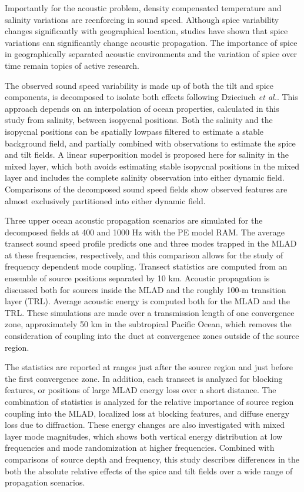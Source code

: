 \documentclass[preprint,NumberedRefs]{JASA}
\begin{document}
Importantly for the acoustic problem, density compensated temperature and salinity variations are reenforcing in sound speed. Although spice variability changes significantly with geographical location, studies have shown that spice variations can significantly change acoustic propagation\citep{colosi12,colosi13,murat2021}. The importance of spice in geographically separated acoustic environments and the variation of spice over time remain topics of active research.

The observed sound speed variability is made up of both the tilt and spice components, is decomposed to isolate both effects following Dzieciuch \emph{et al.}\citep{dzieciuch2004}. This approach depends on an interpolation of ocean properties, calculated in this study from salinity, between isopycnal positions. Both the salinity and the isopycnal positions can be spatially lowpass filtered to estimate a stable background field, and partially combined with observations to estimate the spice and tilt fields. A linear superposition model is proposed here for salinity in the mixed layer, which both avoids estimating stable isopycnal positions in the mixed layer and includes the complete salinity observation into either dynamic field. Comparisons of the decomposed sound speed fields show observed features are almost exclusively partitioned into either dynamic field.

Three upper ocean acoustic propagation scenarios are simulated for the decomposed fields at 400 and 1000 Hz with the PE model RAM\cite{collins93}. The average transect sound speed profile predicts one and three modes trapped in the MLAD at these frequencies, respectively, and this comparison allows for the study of frequency dependent mode coupling. Transect statistics are computed from an ensemble of source positions separated by 10 km. Acoustic propagation is discussed both for sources inside the MLAD and the roughly 100-m transition layer (TRL). Average acoustic energy is computed both for the MLAD and the TRL. These simulations are made over a transmission length of one convergence zone\citep{jensen2011computational}, approximately 50 km in the subtropical Pacific Ocean, which removes the consideration of coupling into the duct at convergence zones outside of the source region\citep{colosi2020observations}.

The statistics are reported at ranges just after the source region and just before the first convergence zone. In addition, each transect is analyzed for blocking features\citep{colosi2020observations}, or positions of large MLAD energy loss over a short distance. The combination of statistics is analyzed for the relative importance of source region coupling into the MLAD, localized loss at blocking features, and diffuse energy loss due to diffraction. These energy changes are also investigated with mixed layer mode magnitudes, which shows both vertical energy distribution at low frequencies and mode randomization at higher frequencies. Combined with comparisons of source depth and frequency, this study describes differences in the both the absolute relative effects of the spice and tilt fields over a wide range of propagation scenarios.
\end{document}
